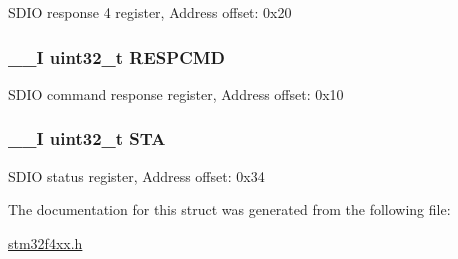 S\-D\-I\-O response 4 register, Address offset\-: 0x20 \hypertarget{struct_s_d_i_o___type_def_aad371db807e2db4a2edf05b3f2f4b6cd}{
\subsubsection[{R\-E\-S\-P\-C\-M\-D}]{\setlength{\rightskip}{0pt plus 5cm}\-\_\-\-\_\-\-I uint32\-\_\-t R\-E\-S\-P\-C\-M\-D}}\label{struct_s_d_i_o___type_def_aad371db807e2db4a2edf05b3f2f4b6cd}
S\-D\-I\-O command response register, Address offset\-: 0x10 \hypertarget{struct_s_d_i_o___type_def_a7520cdf6f3df68c2f147bdd87fb8a96f}{
\subsubsection[{S\-T\-A}]{\setlength{\rightskip}{0pt plus 5cm}\-\_\-\-\_\-\-I uint32\-\_\-t S\-T\-A}}\label{struct_s_d_i_o___type_def_a7520cdf6f3df68c2f147bdd87fb8a96f}
S\-D\-I\-O status register, Address offset\-: 0x34 

The documentation for this struct was generated from the following file\-:\begin{DoxyCompactItemize}
\item 
\hyperlink{stm32f4xx_8h}{stm32f4xx.\-h}\end{DoxyCompactItemize}
